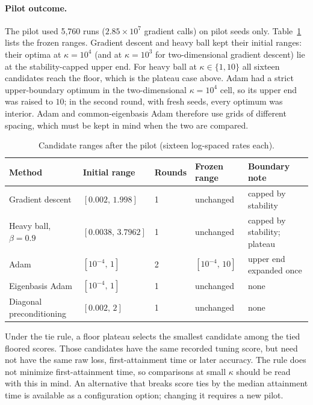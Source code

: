 \documentclass[11pt,a4paper]{article}
\begin{document}
\paragraph{Pilot outcome.} The pilot used 5{,}760 runs ($2.85\times10^{7}$
gradient calls) on pilot seeds only. Table~\ref{tab:pilot} lists the frozen
ranges. Gradient descent and heavy ball kept their initial ranges: their optima
at $\kappa=10^4$ (and at $\kappa=10^3$ for two-dimensional gradient descent)
lie at the stability-capped upper end. For heavy ball at $\kappa\in\{1,10\}$
all sixteen candidates reach the floor, which is the plateau case above. Adam
had a strict upper-boundary optimum in the two-dimensional $\kappa=10^4$ cell,
so its upper end was raised to $10$; in the second round, with fresh seeds,
every optimum was interior. Adam and common-eigenbasis Adam therefore use grids
of different spacing, which must be kept in mind when the two are compared.

\begin{table}[h]
\centering
\caption{Candidate ranges after the pilot (sixteen log-spaced rates each).}
\label{tab:pilot}
\small
\begin{tabular}{@{}lllll@{}}
\toprule
Method & Initial range & Rounds & Frozen range & Boundary note \\
\midrule
Gradient descent & $[0.002,\,1.998]$ & 1 & unchanged & capped by stability \\
Heavy ball, $\beta=0.9$ & $[0.0038,\,3.7962]$ & 1 & unchanged & capped by stability; plateau \\
Adam & $[10^{-4},\,1]$ & 2 & $[10^{-4},\,10]$ & upper end expanded once \\
Eigenbasis Adam & $[10^{-4},\,1]$ & 1 & unchanged & none \\
Diagonal preconditioning & $[0.002,\,2]$ & 1 & unchanged & none \\
\bottomrule
\end{tabular}
\end{table}

Under the tie rule, a floor plateau selects the smallest candidate among
the tied floored scores. Those candidates have the same recorded tuning score,
but need not have the same raw loss, first-attainment time or later accuracy.
The rule does not minimize first-attainment time, so comparisons at small
$\kappa$ should be read with this in mind. An
alternative that breaks score ties by the median attainment time is available
as a configuration option; changing it requires a new pilot.
\end{document}
